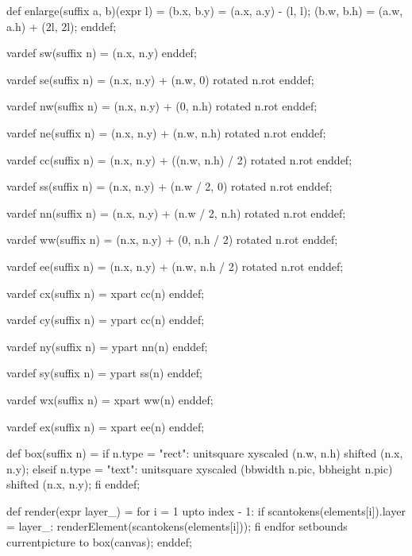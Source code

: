 def enlarge(suffix a, b)(expr l) =
  (b.x, b.y) = (a.x, a.y) - (l, l);
  (b.w, b.h) = (a.w, a.h) + (2l, 2l);
enddef;

vardef sw(suffix n) =
  (n.x, n.y)
enddef;

vardef se(suffix n) =
  (n.x, n.y) + (n.w, 0) rotated n.rot
enddef;

vardef nw(suffix n) =
  (n.x, n.y) + (0, n.h) rotated n.rot
enddef;

vardef ne(suffix n) =
  (n.x, n.y) + (n.w, n.h) rotated n.rot
enddef;

vardef cc(suffix n) =
  (n.x, n.y) + ((n.w, n.h) / 2) rotated n.rot
enddef;

vardef ss(suffix n) =
  (n.x, n.y) + (n.w / 2, 0) rotated n.rot
enddef;

vardef nn(suffix n) =
  (n.x, n.y) + (n.w / 2, n.h) rotated n.rot
enddef;

vardef ww(suffix n) =
  (n.x, n.y) + (0, n.h / 2) rotated n.rot
enddef;

vardef ee(suffix n) =
  (n.x, n.y) + (n.w, n.h / 2) rotated n.rot
enddef;

vardef cx(suffix n) =
  xpart cc(n)
enddef;

vardef cy(suffix n) =
  ypart cc(n)
enddef;

vardef ny(suffix n) =
  ypart nn(n)
enddef;

vardef sy(suffix n) =
  ypart ss(n)
enddef;

vardef wx(suffix n) =
  xpart ww(n)
enddef;

vardef ex(suffix n) =
  xpart ee(n)
enddef;

def box(suffix n) =
  if n.type = "rect":
    unitsquare xyscaled (n.w, n.h) shifted (n.x, n.y);
  elseif n.type = "text":
    unitsquare xyscaled (bbwidth n.pic, bbheight n.pic) shifted (n.x, n.y);
  fi
enddef;

def render(expr layer_) =
  for i = 1 upto index - 1:
    if scantokens(elements[i]).layer = layer_:
      renderElement(scantokens(elements[i]));
    fi
  endfor
  setbounds currentpicture to box(canvas);
enddef;

